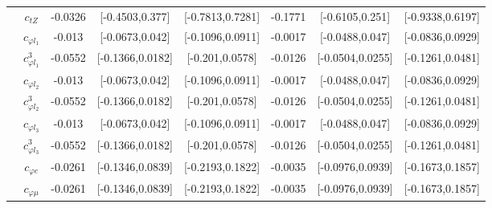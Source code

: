 \documentclass{article}
\begin{document}
\begin{table}[H]
\begin{tabular}{|c|c|c|c|c|c|c|c|}
 & $c_{tZ}$ & -0.0326                             & [-0.4503,0.377]                                 & [-0.7813,0.7281] & -0.1771                             & [-0.6105,0.251]                                 & [-0.9338,0.6197] \\ \cline{2-8}
 & $c_{\varphi l_1}$ & -0.013                             & [-0.0673,0.042]                                 & [-0.1096,0.0911] & -0.0017                             & [-0.0488,0.047]                                 & [-0.0836,0.0929] \\ \cline{2-8}
 & $c_{\varphi l_1}^{3}$ & -0.0552                             & [-0.1366,0.0182]                                 & [-0.201,0.0578] & -0.0126                             & [-0.0504,0.0255]                                 & [-0.1261,0.0481] \\ \cline{2-8}
 & $c_{\varphi l_2}$ & -0.013                             & [-0.0673,0.042]                                 & [-0.1096,0.0911] & -0.0017                             & [-0.0488,0.047]                                 & [-0.0836,0.0929] \\ \cline{2-8}
 & $c_{\varphi l_2}^{3}$ & -0.0552                             & [-0.1366,0.0182]                                 & [-0.201,0.0578] & -0.0126                             & [-0.0504,0.0255]                                 & [-0.1261,0.0481] \\ \cline{2-8}
 & $c_{\varphi l_3}$ & -0.013                             & [-0.0673,0.042]                                 & [-0.1096,0.0911] & -0.0017                             & [-0.0488,0.047]                                 & [-0.0836,0.0929] \\ \cline{2-8}
 & $c_{\varphi l_3}^{3}$ & -0.0552                             & [-0.1366,0.0182]                                 & [-0.201,0.0578] & -0.0126                             & [-0.0504,0.0255]                                 & [-0.1261,0.0481] \\ \cline{2-8}
 & $c_{\varphi e}$ & -0.0261                             & [-0.1346,0.0839]                                 & [-0.2193,0.1822] & -0.0035                             & [-0.0976,0.0939]                                 & [-0.1673,0.1857] \\ \cline{2-8}
 & $c_{\varphi \mu}$ & -0.0261                             & [-0.1346,0.0839]                                 & [-0.2193,0.1822] & -0.0035                             & [-0.0976,0.0939]                                 & [-0.1673,0.1857] \\ \cline{2-8}

\end{tabular}
\end{table}
\end{document}
